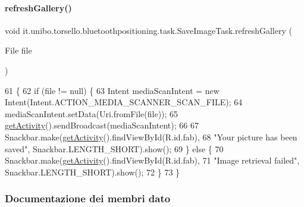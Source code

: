 \paragraph{\texorpdfstring{refresh\+Gallery()}{refreshGallery()}}
{\footnotesize\ttfamily void it.\+unibo.\+torsello.\+bluetoothpositioning.\+task.\+Save\+Image\+Task.\+refresh\+Gallery (\begin{DoxyParamCaption}\item[{File}]{file }\end{DoxyParamCaption})\hspace{0.3cm}{\ttfamily [private]}}


\begin{DoxyCode}
61                                            \{
62         \textcolor{keywordflow}{if} (file != null) \{
63             Intent mediaScanIntent = \textcolor{keyword}{new} Intent(Intent.ACTION\_MEDIA\_SCANNER\_SCAN\_FILE);
64             mediaScanIntent.setData(Uri.fromFile(file));
65             \hyperlink{classit_1_1unibo_1_1torsello_1_1bluetoothpositioning_1_1task_1_1SaveImageTask_a6fda270f42937b64e3767644e7dd63a5_a6fda270f42937b64e3767644e7dd63a5}{getActivity}().sendBroadcast(mediaScanIntent);
66 
67             Snackbar.make(\hyperlink{classit_1_1unibo_1_1torsello_1_1bluetoothpositioning_1_1task_1_1SaveImageTask_a6fda270f42937b64e3767644e7dd63a5_a6fda270f42937b64e3767644e7dd63a5}{getActivity}().findViewById(R.id.fab),
68                     \textcolor{stringliteral}{"Your picture has been saved"}, Snackbar.LENGTH\_SHORT).show();
69         \} \textcolor{keywordflow}{else} \{
70             Snackbar.make(\hyperlink{classit_1_1unibo_1_1torsello_1_1bluetoothpositioning_1_1task_1_1SaveImageTask_a6fda270f42937b64e3767644e7dd63a5_a6fda270f42937b64e3767644e7dd63a5}{getActivity}().findViewById(R.id.fab),
71                     \textcolor{stringliteral}{"Image retrieval failed"}, Snackbar.LENGTH\_SHORT).show();
72         \}
73     \}
\end{DoxyCode}


\subsubsection{Documentazione dei membri dato}
\hypertarget{classit_1_1unibo_1_1torsello_1_1bluetoothpositioning_1_1task_1_1SaveImageTask_a340aca6a2cdcfbf41aed236588669203_a340aca6a2cdcfbf41aed236588669203}{}\label{classit_1_1unibo_1_1torsello_1_1bluetoothpositioning_1_1task_1_1SaveImageTask_a340aca6a2cdcfbf41aed236588669203_a340aca6a2cdcfbf41aed236588669203} 
